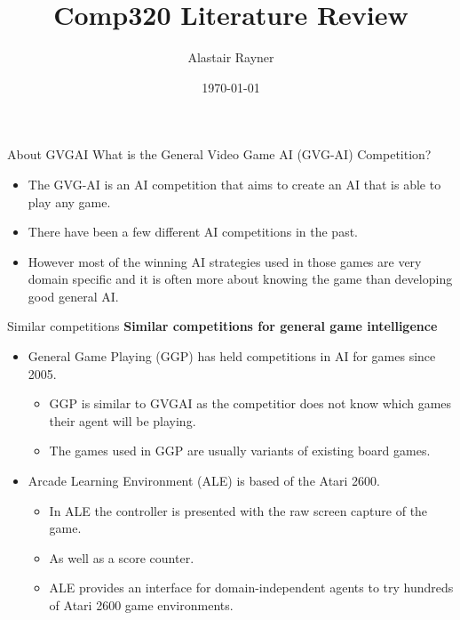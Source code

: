 \documentclass{beamer}
\title{Comp320 Literature Review}
\author{Alastair Rayner}
\date{\today}
\begin{document}
\maketitle


\begin{frame}{About GVGAI}
	  What is the General Video Game AI (GVG-AI) Competition? \pause
	  \begin{itemize}
	      \item The GVG-AI is an AI competition that aims to create an AI that is able to play any game. \pause
	      \item There have been a few different AI competitions in the past. \pause
	      \item However most of the winning AI strategies used in those games are very domain specific and it is often more about knowing the game than developing good general AI. \pause
	  \end{itemize}
\end{frame}


\begin{frame}{Similar competitions}	
	\textbf{Similar competitions for general game intelligence} \pause
		\begin{itemize}
			\item General Game Playing (GGP) has held competitions in AI for games since 2005. \pause
			\begin{itemize}
				\item GGP is similar to GVGAI as the competitior does not know which games their agent will be playing.
				\item The games used in GGP are usually variants of existing board games.
			\end{itemize}
			\item Arcade Learning Environment (ALE) is based of the Atari 2600. \pause
			\begin{itemize}
				\item In ALE the controller is presented with the raw screen capture of the game.
				\item As well as a score counter.
				\item ALE provides an interface for domain-independent agents to try hundreds of Atari 2600 game environments.
			\end{itemize}
		\end{itemize}
\end{frame}
\end{document}
